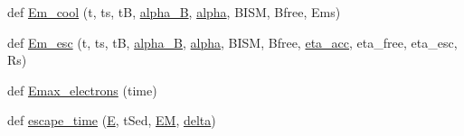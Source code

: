 \begin{DoxyCompactItemize}
\item 
def \hyperlink{namespaceelectrons__emax__t_ae898717ff3e5f717736fd77dd7ced7b4}{Em\+\_\+cool} (t, ts, tB, \hyperlink{namespaceelectrons__emax__t_a80e5be66eafafacb2d2f62f7dbfaf8d5}{alpha\+\_\+B}, \hyperlink{namespaceelectrons__emax__t_a2ca4cffb383bb74bb2caacc4e62728b4}{alpha}, B\+I\+SM, Bfree, Ems)
\item 
def \hyperlink{namespaceelectrons__emax__t_a369f38813e74f5ba6f617bcf0ab7c43a}{Em\+\_\+esc} (t, ts, tB, \hyperlink{namespaceelectrons__emax__t_a80e5be66eafafacb2d2f62f7dbfaf8d5}{alpha\+\_\+B}, \hyperlink{namespaceelectrons__emax__t_a2ca4cffb383bb74bb2caacc4e62728b4}{alpha}, B\+I\+SM, Bfree, \hyperlink{constants_8h_a7dd0fdc6bda4f1811187b7e6f8e73812}{eta\+\_\+acc}, eta\+\_\+free, eta\+\_\+esc, Rs)
\item 
def \hyperlink{namespaceelectrons__emax__t_a46d478aad7c92949d8617bac3e55ab9a}{Emax\+\_\+electrons} (time)
\item 
def \hyperlink{namespaceelectrons__emax__t_ac1f4ff8526d676dd17fa9096e04d5880}{escape\+\_\+time} (\hyperlink{namespaceelectrons__emax__t_a887d1266ad684afdfee916581795c117}{E}, t\+Sed, \hyperlink{namespaceelectrons__emax__t_a759687528be35726f29d4493933a9734}{EM}, \hyperlink{constants_8h_a80a3c65c6b77216165fc34c12d0744e9}{delta})
\end{DoxyCompactItemize}
